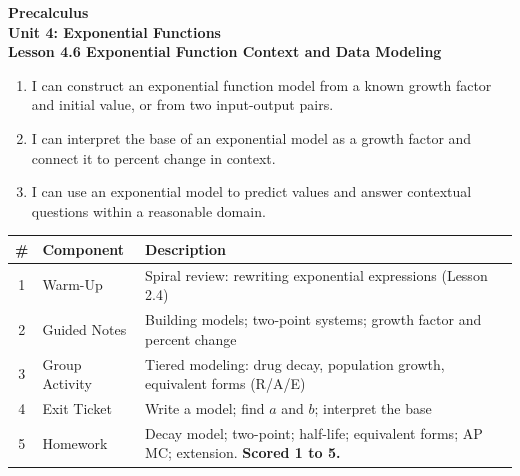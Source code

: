 \documentclass[10pt]{article}
\begin{document}
\vspace{-0.8in}

\begin{center}
  {\color{white}\textbf{\LARGE Precalculus}}\\[4pt]
  {\color{skymid}\large\textbf{Unit 4: Exponential Functions}}\\[6pt]
  {\color{white}\textbf{\large Lesson 4.6 \quad Exponential Function Context and Data Modeling}}
\end{center}

\vspace{0.22in}
\namedateperiod
\vspace{0.18in}

\begin{learningtargetbox}
\small
\begin{enumerate}[leftmargin=1.5em, itemsep=5pt]
  \item I can construct an exponential function model from a known growth factor and initial
        value, or from two input-output pairs.
  \item I can interpret the base of an exponential model as a growth factor and connect it to
        percent change in context.
  \item I can use an exponential model to predict values and answer contextual questions within
        a reasonable domain.
\end{enumerate}
\end{learningtargetbox}

\vspace{0.14in}

\begin{tocbox}
\small
\renewcommand{\arraystretch}{1.5}
\begin{tabularx}{\linewidth}{@{} c l X @{}}
\rowcolor{sky}
\textbf{\#} & \textbf{Component} & \textbf{Description} \\
\midrule
1 & Warm-Up        & Spiral review: rewriting exponential expressions (Lesson 2.4) \\
2 & Guided Notes   & Building models; two-point systems; growth factor and percent change \\
3 & Group Activity & Tiered modeling: drug decay, population growth, equivalent forms (R/A/E) \\
4 & Exit Ticket    & Write a model; find $a$ and $b$; interpret the base \\
5 & Homework       & Decay model; two-point; half-life; equivalent forms; AP MC; extension. \textbf{Scored 1 to 5.} \\
\end{tabularx}
\end{tocbox}
\end{document}
